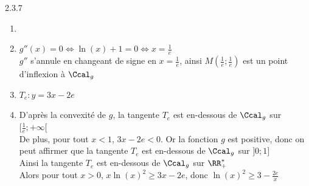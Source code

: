 \begin{Solution}{2.3.7}
	\begin{enumerate}
		\item {}
		\item[3.] $g''(x)=0\Leftrightarrow\ln(x)+1=0\Leftrightarrow x=\frac{1}{e}$\\
		$g''$ s'annule en changeant de signe en $x=\frac{1}{e}$, ainsi $M\left(\frac{1}{e};\frac{1}{e}\right)$ est un point d'inflexion à $\Ccal_g$
		\item[4.] $T_e:y=3x-2e$
		\item[5.] D'après la convexité de $g$, la tangente $T_e$ est en-dessous de $\Ccal_g$ sur $[\frac{1}{e};+\infty[$\\
		De plus, pour tout $x<1$, $3x-2e<0$. Or la fonction $g$ est positive, donc on peut affirmer que la tangente $T_e$ est en-dessous de $\Ccal_g$ sur $]0;1]$\\
		Ainsi la tangente $T_e$ est en-dessous de $\Ccal_g$ sur $\RR_+^*$\\
		Alors pour tout $x>0$, $x\ln(x)^2\geq 3x-2e$, donc $\ln(x)^2\geq3-\frac{2e}{x}$
	\end{enumerate}
\end{Solution}
